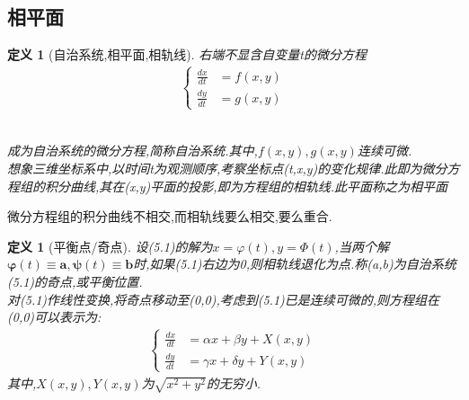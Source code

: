 \documentclass[12pt, a4paper, oneside]{ctexbook}
\newtheorem{definition}[theorem]{定义}
\begin{document}
    \subsection{相平面}
        \begin{definition}[自治系统,相平面,相轨线]
            右端不显含自变量t的微分方程\\\centering
            \begin{equation}
                \begin{aligned}
                    \begin{cases}
                        \frac{dx}{dt} &= f(x,y)\\
                        \frac{dy}{dt} &= g(x,y)
                    \end{cases}
                \end{aligned}
            \end{equation}\\\raggedright
        成为自治系统的微分方程,简称自治系统.其中,$f(x,y),g(x,y)$连续可微.\\
        想象三维坐标系中,以时间t为观测顺序,考察坐标点(t,x,y)的变化规律.此即为微分方程组的积分曲线,其在(x,y)平面的投影,即为方程组的相轨线.此平面称之为相平面\\
        \end{definition}
        微分方程组的积分曲线不相交,而相轨线要么相交,要么重合.
        \begin{definition}[平衡点/奇点]
            设(5.1)的解为$ x= \varphi(t), y= \Phi(t)$,当两个解$\boldsymbol{\varphi}(t)\equiv\boldsymbol{a},\boldsymbol{\psi}(t)\equiv\boldsymbol{b}$时,如果(5.1)右边为0,则相轨线退化为点.称(a,b)为自治系统(5.1)的奇点,或平衡位置.\\
            对(5.1)作线性变换,将奇点移动至(0,0),考虑到(5.1)已是连续可微的,则方程组在(0,0)可以表示为:
            \begin{equation}
                \begin{aligned}
                    \begin{cases}
                        \frac{dx}{dt} &= \alpha x + \beta y + X(x,y)\\
                        \frac{dy}{dt} &= \gamma x + \delta y + Y(x,y)
                    \end{cases}
                \end{aligned}
            \end{equation}
            其中,$X(x,y),Y(x,y)$为$\sqrt{x^2+y^2}$的无穷小.
        \end{definition}
\end{document}
